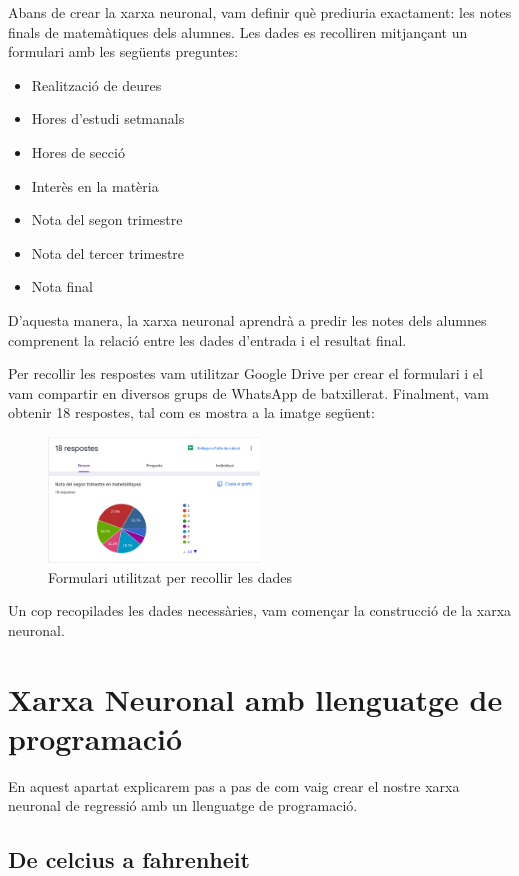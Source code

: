 Abans de crear la xarxa neuronal, vam definir què prediuria exactament: les notes finals de matemàtiques dels alumnes. Les dades es recolliren mitjançant un formulari amb les següents preguntes:

\begin{itemize}
\item Realització de deures
\item Hores d’estudi setmanals
\item Hores de secció
\item Interès en la matèria
\item Nota del segon trimestre
\item Nota del tercer trimestre
\item Nota final
\end{itemize}

D’aquesta manera, la xarxa neuronal aprendrà a predir les notes dels alumnes comprenent la relació entre les dades d’entrada i el resultat final.

Per recollir les respostes vam utilitzar Google Drive per crear el formulari i el vam compartir en diversos grups de WhatsApp de batxillerat. Finalment, vam obtenir 18 respostes, tal com es mostra a la imatge següent:

\begin{figure}
\centering
\includegraphics[width=0.5\textwidth]{./figures/Formulari.png}
\caption{Formulari utilitzat per recollir les dades}
\end{figure}

Un cop recopilades les dades necessàries, vam començar la construcció de la xarxa neuronal.

\section{Xarxa Neuronal amb llenguatge de programació}\label{sec:10}
En aquest apartat explicarem pas a pas de com vaig crear el nostre xarxa neuronal de regressió amb un llenguatge de programació.

\subsection{De celcius a fahrenheit}

